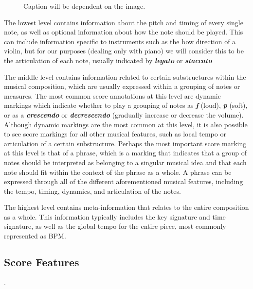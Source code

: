 \begin{figure}
    \centering
    \caption{Caption will be dependent on the image.}
    \label{fig:score_hierarchy}
\end{figure}

\newcommand{\mnot}[1]{\textbf{\emph{#1}}}

The lowest level contains information about the pitch and timing of every single note, as well as optional information about how the note should be played. This can include information specific to instruments such as the bow direction of a violin, but for our purposes (dealing only with piano) we will consider this to be the articulation of each note, usually indicated by \mnot{legato} or \mnot{staccato} 

The middle level contains information related to certain substructures within the musical composition, which are usually expressed within a grouping of notes or measures. The most common score annotations at this level are dynamic markings which indicate whether to play a grouping of notes as \mnot{f} (loud), \mnot{p} (soft), or as a \mnot{crescendo} or \mnot{decrescendo} (gradually increase or decrease the volume). %
Although dynamic markings are the most common at this level, it is also possible to see score markings for all other musical features, such as local tempo or articulation of a certain substructure. Perhaps the most important score marking at this level is that of a phrase, which is a marking that indicates that a group of notes should be interpreted as belonging to a singular musical idea and that each note should fit within the context of the phrase as a whole. A phrase can be expressed through all of the different aforementioned musical features, including the tempo, timing, dynamics, and articulation of the notes.

The highest level contains meta-information that relates to the entire composition as a whole. This information typically includes the key signature and time signature, as well as the global tempo for the entire piece, most commonly represented as BPM. 

\subsection{Score Features}
.

